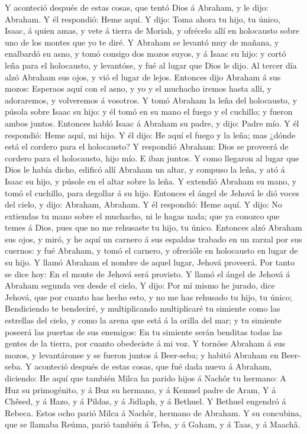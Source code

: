  Y aconteció después de estas cosas, que tentó Dios á
Abraham, y le dijo: Abraham. Y él respondió: Heme aquí.  Y
dijo: Toma ahora tu hijo, tu único, Isaac, á quien amas, y vete á tierra
de Moriah, y ofrécelo allí en holocausto sobre uno de los montes que yo
te diré.  Y Abraham se levantó muy de mañana, y enalbardó su
asno, y tomó consigo dos mozos suyos, y á Isaac su hijo: y cortó leña
para el holocausto, y levantóse, y fué al lugar que Dios le dijo.
 Al tercer día alzó Abraham sus ojos, y vió el lugar de
lejos.  Entonces dijo Abraham á sus mozos: Esperaos aquí con
el asno, y yo y el muchacho iremos hasta allí, y adoraremos, y
volveremos á vosotros.  Y tomó Abraham la leña del
holocausto, y púsola sobre Isaac su hijo: y él tomó en su mano el fuego
y el cuchillo; y fueron ambos juntos.  Entonces habló Isaac
á Abraham su padre, y dijo: Padre mío. Y él respondió: Heme aquí, mi
hijo. Y él dijo: He aquí el fuego y la leña; mas ¿dónde está el cordero
para el holocausto?  Y respondió Abraham: Dios se proveerá
de cordero para el holocausto, hijo mío. E iban juntos.  Y
como llegaron al lugar que Dios le había dicho, edificó allí Abraham un
altar, y compuso la leña, y ató á Isaac su hijo, y púsole en el altar
sobre la leña.  Y extendió Abraham su mano, y tomó el
cuchillo, para degollar á su hijo.  Entonces el ángel de
Jehová le dió voces del cielo, y dijo: Abraham, Abraham. Y él respondió:
Heme aquí.  Y dijo: No extiendas tu mano sobre el muchacho,
ni le hagas nada; que ya conozco que temes á Dios, pues que no me
rehusaste tu hijo, tu único.  Entonces alzó Abraham sus
ojos, y miró, y he aquí un carnero á sus espaldas trabado en un zarzal
por sus cuernos: y fué Abraham, y tomó el carnero, y ofrecióle en
holocausto en lugar de su hijo.  Y llamó Abraham el nombre
de aquel lugar, Jehová proveerá. Por tanto se dice hoy: En el monte de
Jehová será provisto.  Y llamó el ángel de Jehová á Abraham
segunda vez desde el cielo,  Y dijo: Por mí mismo he
jurado, dice Jehová, que por cuanto has hecho esto, y no me has rehusado
tu hijo, tu único;  Bendiciendo te bendeciré, y
multiplicando multiplicaré tu simiente como las estrellas del cielo, y
como la arena que está á la orilla del mar; y tu simiente poseerá las
puertas de sus enemigos:  En tu simiente serán benditas
todas las gentes de la tierra, por cuanto obedeciste á mi voz.
 Y tornóse Abraham á sus mozos, y levantáronse y se fueron
juntos á Beer-seba; y habitó Abraham en Beer-seba.  Y
aconteció después de estas cosas, que fué dada nueva á Abraham,
diciendo: He aquí que también Milca ha parido hijos á Nachôr tu hermano:
 A Huz su primogénito, y á Buz su hermano, y á Kemuel padre
de Aram,  Y á Chêsed, y á Hazo, y á Pildas, y á Jidlaph, y
á Bethuel.  Y Bethuel engendró á Rebeca. Estos ocho parió
Milca á Nachôr, hermano de Abraham.  Y su concubina, que se
llamaba Reúma, parió también á Teba, y á Gaham, y á Taas, y á Maachâ.

